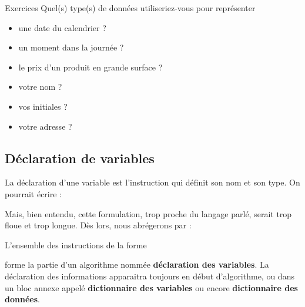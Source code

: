 			
			\begin{Emphase}[exercice]{Exercices}
				Quel(s) type(s) de données utiliseriez-vous 
				pour représenter 
				\begin{itemize}
					\item une date du calendrier ?
					\item un moment dans la journée ?
					\item le prix d'un produit en grande surface ?
					\item votre nom ?
					\item vos initiales ?
					\item votre adresse ?
				\end{itemize}
				
				\bigskip
				
			\end{Emphase}

		\subsection{Déclaration de variables}

			La déclaration d’une variable est l’instruction 
			qui définit son nom et son type. On pourrait écrire :

			
			Mais, bien entendu, cette formulation, trop proche du
			langage parlé, serait trop floue et trop longue. 
			Dès lors, nous abrégerons par :


			L’ensemble des instructions de la forme


			forme la partie d’un algorithme nommée 
			\textbf{déclaration des variables}. 
			La déclaration des informations apparaitra toujours en
			début d’algorithme, ou dans un bloc annexe appelé 
			\textbf{dictionnaire des variables} 
			ou encore \textbf{dictionnaire des données}.

